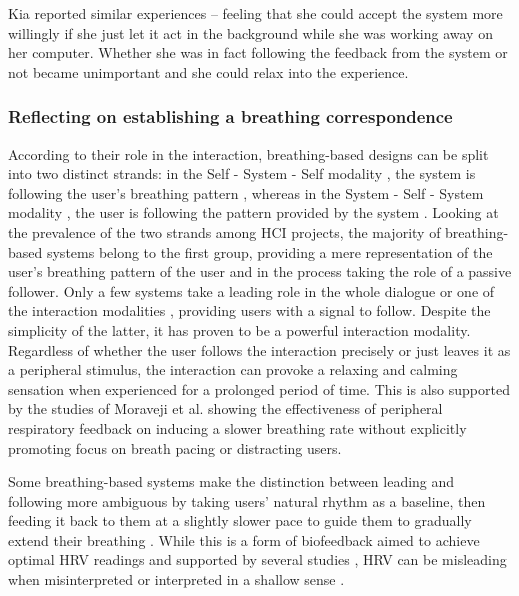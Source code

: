 Kia reported similar experiences -- feeling that she could accept the system more willingly if she just let it act in the background while she was working away on her computer. Whether she was in fact following the feedback from the system or not became unimportant and she could relax into the experience. 

\subsubsection{Reflecting on establishing a breathing correspondence}

According to their role in the interaction, breathing-based designs can be split into two distinct strands: in the Self - System - Self modality \cite{prpa_inhaling_2020}, the system is following the user's breathing pattern \cite{abushakra_augmenting_2014, sonne_chillfish_2016, bingham_breath_2010, roo_inner_2017, prpa_hacking_2016, shaw_meditation_2007, aslan_hold_2016, pisa_towards_2017, sjoman_breathing_2018, moran_exopranayama_2016}, whereas in the System - Self - System modality \cite{prpa_inhaling_2020}, the user is following the pattern provided by the system \cite{wongsuphasawat_you_2012, yu_breathe_2015, soyka_enhancing_2016, dijk_breathe_2011}. Looking at the prevalence of the two strands among HCI projects, the majority of breathing-based systems belong to the first group, providing a mere representation of the user's breathing pattern of the user and in the process taking the role of a passive follower. Only a few systems take a leading role in the whole dialogue \cite{wongsuphasawat_you_2012, yu_breathe_2015, soyka_enhancing_2016} or one of the interaction modalities \cite{bumatay_investigating_2017, patibanda_life_2017}, providing users with a signal to follow. Despite the simplicity of the latter, it has proven to be a powerful interaction modality. Regardless of whether the user follows the interaction precisely or just leaves it as a peripheral stimulus, the interaction can provoke a relaxing and calming sensation when experienced for a prolonged period of time. This is also supported by the studies of Moraveji et al. \cite{moraveji_peripheral_2011, moraveji_breathtray_2012} showing the effectiveness of peripheral respiratory feedback on inducing a slower breathing rate without explicitly promoting focus on breath pacing or distracting users. 

Some breathing-based systems make the distinction between leading and following more ambiguous by taking users' natural rhythm as a baseline, then feeding it back to them at a slightly slower pace to guide them to gradually extend their breathing \cite{moraveji_peripheral_2011, ghandeharioun_brightbeat_2017}. While this is a form of biofeedback aimed to achieve optimal HRV readings and supported by several studies \cite{vaschillo_characteristics_2006, steffen_impact_2017, sutarto_resonant_2012}, HRV can be misleading when misinterpreted or interpreted in a shallow sense \cite{cammann_how_2002}. 

